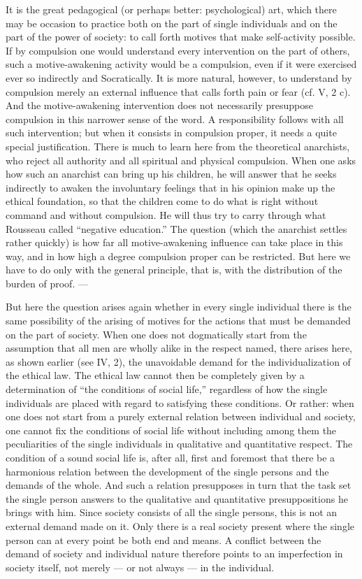 \documentclass[12pt,a4paper,openany]{book}
\newcommand{\opage}[1]{\marginnote{\footnotesize\textit{[#1]}}}
\begin{document}
It is the great pedagogical (or perhaps better: psychological) art, which there may be occasion to practice both
on the part of single individuals and on the part of the power of society: to call forth motives that make
self-activity possible. If by compulsion one would understand every intervention on the part of others, such a
motive-awakening activity would be a compulsion, even if it
\opage{178}were exercised ever so indirectly and Socratically. It is more natural, however, to understand by
compulsion merely an external influence that calls forth pain or fear (cf. V, 2 c). And the motive-awakening
intervention does not necessarily presuppose compulsion in this narrower sense of the word. A responsibility
follows with all such intervention; but when it consists in compulsion proper, it needs a quite special
justification. There is much to learn here from the theoretical anarchists, who reject all authority and all
spiritual and physical compulsion. When one asks how such an anarchist can bring up his children, he will answer
that he seeks indirectly to awaken the involuntary feelings that in his opinion make up the ethical foundation,
so that the children come to do what is right without command and without compulsion. He will thus try to carry
through what Rousseau called ``negative education.'' The question (which the anarchist settles rather quickly)
is how far all motive-awakening influence can take place in this way, and in how high a degree compulsion proper
can be restricted. But here we have to do only with the general principle, that is, with the distribution of the
burden of proof. ---

But here the question arises again whether in every single individual there is the same possibility of the
arising of motives for the actions that must be demanded on the part of society. When one does not dogmatically
start from the assumption that all men are wholly alike in the respect named, there arises here, as shown
earlier (see IV, 2), the unavoidable demand for the individualization of the ethical law. The ethical law cannot
then be completely given by a determination of ``the conditions of social life,'' regardless of how the single
individuals are placed with regard to satisfying these conditions. Or rather: when one does not start from a
purely external relation between individual and society, one cannot fix the conditions of social life without
including among them the peculiarities of the single individuals in qualitative and quantitative respect. The
condition of a sound social life is, after all, first and foremost that there be a harmonious relation between
the development of the single persons and the demands of the whole. And such a relation presupposes in turn that
the task set the single
\opage{179}person answers to the qualitative and quantitative presuppositions he brings with him. Since society
consists of all the single persons, this is not an external demand made on it. Only there is a real society
present where the single person can at every point be both end and means. A conflict between the demand of
society and individual nature therefore points to an imperfection in society itself, not merely --- or not
always --- in the individual.
\end{document}
